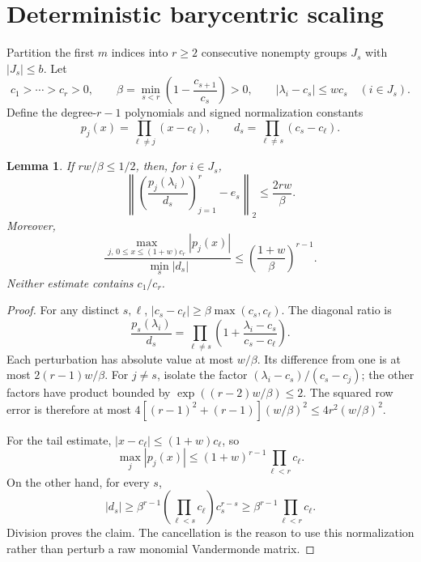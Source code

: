 \documentclass[11pt]{article}
\newtheorem{lemma}[theorem]{Lemma}
\newcommand{\norm}[1]{\left\lVert#1\right\rVert}
\begin{document}
\section{Deterministic barycentric scaling}
Partition the first $m$ indices into $r\ge2$ consecutive nonempty groups
$J_s$ with $|J_s|\le b$. Let
\[
 c_1>\cdots>c_r>0,\qquad
 \beta=\min_{s<r}\left(1-\frac{c_{s+1}}{c_s}\right)>0,
 \qquad |\lambda_i-c_s|\le w c_s\quad(i\in J_s).
\]
Define the degree-$r-1$ polynomials and signed normalization constants
\[
 p_j(x)=\prod_{\ell\ne j}(x-c_\ell),\qquad
 d_s=\prod_{\ell\ne s}(c_s-c_\ell).
\]
\begin{lemma}\label{barycentric}
If $rw/\beta\le1/2$, then, for $i\in J_s$,
\begin{equation}\label{rowerror}
 \norm{\left(\frac{p_j(\lambda_i)}{d_s}\right)_{j=1}^r-e_s}
 _2\le\frac{2rw}{\beta}.
\end{equation}
Moreover,
\begin{equation}\label{tailratio}
 \frac{\displaystyle\max_{j,\,0\le x\le(1+w)c_r}|p_j(x)|}
 {\displaystyle\min_s|d_s|}
 \le\left(\frac{1+w}{\beta}\right)^{r-1}.
\end{equation}
Neither estimate contains $c_1/c_r$.
\end{lemma}
\begin{proof}
For any distinct $s,\ell$,
$|c_s-c_\ell|\ge\beta\max(c_s,c_\ell)$. The diagonal ratio is
\[
 \frac{p_s(\lambda_i)}{d_s}
 =\prod_{\ell\ne s}\left(1+
 \frac{\lambda_i-c_s}{c_s-c_\ell}\right).
\]
Each perturbation has absolute value at most $w/\beta$. Its difference from
one is at most $2(r-1)w/\beta$. For $j\ne s$, isolate the factor
$(\lambda_i-c_s)/(c_s-c_j)$; the other factors have product bounded by
$\exp((r-2)w/\beta)\le2$. The squared row error is therefore at most
$4[(r-1)^2+(r-1)](w/\beta)^2\le4r^2(w/\beta)^2$.

For the tail estimate, $|x-c_\ell|\le(1+w)c_\ell$, so
\[
 \max_j|p_j(x)|\le(1+w)^{r-1}\prod_{\ell<r}c_\ell.
\]
On the other hand, for every $s$,
\[
 |d_s|\ge\beta^{r-1}
 \left(\prod_{\ell<s}c_\ell\right)c_s^{r-s}
 \ge\beta^{r-1}\prod_{\ell<r}c_\ell.
\]
Division proves the claim. The cancellation is the reason to use this
normalization rather than perturb a raw monomial Vandermonde matrix.
\end{proof}
\end{document}

